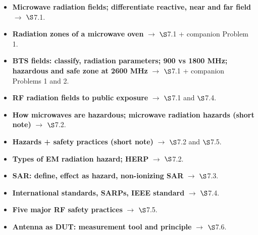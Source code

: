 \vspace{2pt}


\begin{itemize}
  \item \textbf{Microwave radiation fields; differentiate reactive, near and far field}
    $\rightarrow$ $\S$7.1. 
  \item \textbf{Radiation zones of a microwave oven} $\rightarrow$ $\S$7.1 + companion
    Problem 1. 
  \item \textbf{BTS fields: classify, radiation parameters; 900 vs 1800 MHz; hazardous and
    safe zone at 2600 MHz} $\rightarrow$ $\S$7.1 + companion Problems 1 and 2.
  \item \textbf{RF radiation fields to public exposure} $\rightarrow$ $\S$7.1 and $\S$7.4.
  \item \textbf{How microwaves are hazardous; microwave radiation hazards (short note)}
    $\rightarrow$ $\S$7.2. 
  \item \textbf{Hazards + safety practices (short note)} $\rightarrow$ $\S$7.2 and $\S$7.5.
  \item \textbf{Types of EM radiation hazard; HERP} $\rightarrow$ $\S$7.2.
  \item \textbf{SAR: define, effect as hazard, non-ionizing SAR} $\rightarrow$ $\S$7.3.
  \item \textbf{International standards, SARPs, IEEE standard} $\rightarrow$ $\S$7.4.
  \item \textbf{Five major RF safety practices} $\rightarrow$ $\S$7.5. 
  \item \textbf{Antenna as DUT: measurement tool and principle} $\rightarrow$ $\S$7.6.
\end{itemize}

